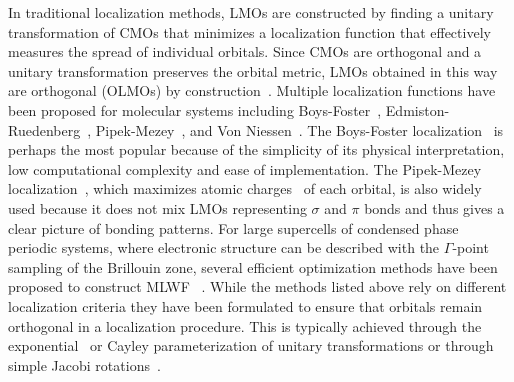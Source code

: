 \documentclass[aps,prl,reprint,amsmath,amssymb]{revtex4-1}
\begin{document}
In traditional localization methods, LMOs are constructed by finding a unitary transformation of CMOs that minimizes a localization function that effectively measures the spread of individual orbitals. 
Since CMOs are orthogonal and a unitary transformation preserves the orbital metric, LMOs obtained in this way are orthogonal (OLMOs) by construction~\cite{weinstein1971localized}.
Multiple localization functions have been proposed for molecular systems including Boys-Foster~\cite{boys1960construction}, Edmiston-Ruedenberg~\cite{bytautas2002electron, bytautas2003split, edmiston1963localized}, Pipek-Mezey~\cite{pipek1989a_fast}, and Von Niessen~\cite{niessen1972density}. The Boys-Foster localization~\cite{boys1960construction} is perhaps the most popular because of the simplicity of its physical interpretation, low computational complexity and ease of implementation. 
The Pipek-Mezey localization~\cite{pipek1989a_fast}, which maximizes atomic charges~\cite{mulliken1955electronic, lowdin1950non} of each orbital, is also widely used because it does not mix LMOs representing $\sigma$ and $\pi$ bonds and thus gives a clear picture of bonding patterns. 
For large supercells of condensed phase periodic systems, where electronic structure can be described with the $\Gamma$-point sampling of the Brillouin zone, several efficient optimization methods have been proposed to construct MLWF ~\cite{marzari2012maximally, resta1998quantum, resta1999electron, silvestrelli1999maximally, berghold2000general}. 
%
While the methods listed above rely on different localization criteria they have been formulated to ensure that orbitals remain orthogonal in a localization procedure. This is typically achieved through the exponential~\cite{berghold2000general} or Cayley parameterization of unitary transformations or through simple Jacobi rotations~\cite{edmiston1963localized}.
\end{document}
